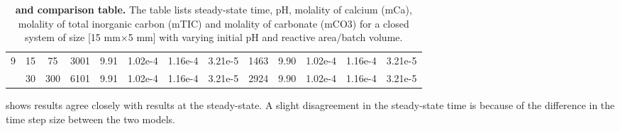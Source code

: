 \begin{table}[ht]
{\begin{tabular}{|c|c|c|c|c|c|c|c|c|c|c|c|c|}
    9 & 15 & 75  & 3001 & 9.91 & 1.02e-4 & 1.16e-4 & 3.21e-5 & 1463 & 9.90 & 1.02e-4 & 1.16e-4 & 3.21e-5 \\
      & 30 & 300 & 6101 & 9.91 & 1.02e-4 & 1.16e-4 & 3.21e-5 & 2924 & 9.90 & 1.02e-4 & 1.16e-4 & 3.21e-5 \\
    \hline
\end{tabular}}
\caption [\DuMuX and \MATLAB comparison table.] {\textbf{\DuMuX and \MATLAB comparison table.} \small The table lists steady-state time, pH, molality of calcium (mCa), 
molality of total inorganic carbon (mTIC) and molality of carbonate (mCO3) for a closed system of size 
[15 mm$\times$5 mm] with varying initial pH and reactive area/batch volume.}
\label{tab:DumuxVsMatlab}
\end{table}

 shows \MATLAB results agree closely with \DuMuX results at the steady-state. A slight disagreement in the steady-state time is 
because of the difference in the time step size between the two models. \\

